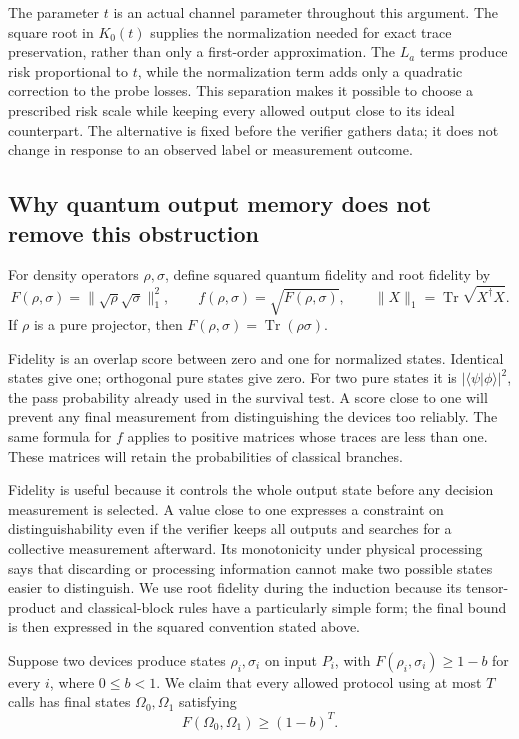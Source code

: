 \documentclass[11pt,a4paper]{article}
\newcommand{\Tr}{\operatorname{Tr}}
\numberwithin{equation}{section}
\begin{document}
The parameter $t$ is an actual channel parameter throughout this argument.
The square root in $K_0(t)$ supplies the normalization needed for exact
trace preservation, rather than only a first-order approximation.  The
$L_a$ terms produce risk proportional to $t$, while the normalization term
adds only a quadratic correction to the probe losses.  This separation
makes it possible to choose a prescribed risk scale while keeping every
allowed output close to its ideal counterpart.  The alternative is fixed
before the verifier gathers data; it does not change in response to an
observed label or measurement outcome.

\subsection{Why quantum output memory does not remove this obstruction}

For density operators $\rho,\sigma$, define squared quantum fidelity and
root fidelity by
\[
 F(\rho,\sigma)=\|\sqrt\rho\sqrt\sigma\|_1^2,
 \qquad f(\rho,\sigma)=\sqrt{F(\rho,\sigma)},
 \qquad \|X\|_1=\Tr\sqrt{X^\dagger X}.
\]
If $\rho$ is a pure projector, then $F(\rho,\sigma)=\Tr(\rho\sigma)$.

Fidelity is an overlap score between zero and one for normalized states.
Identical states give one; orthogonal pure states give zero. For two pure
states it is $|\langle\psi|\phi\rangle|^2$, the pass probability already
used in the survival test. A score close to one will prevent any final
measurement from distinguishing the devices too reliably.
The same formula for $f$ applies to positive matrices whose traces are less
than one.  These matrices will retain the probabilities of classical
branches.

Fidelity is useful because it controls the whole output state before any
decision measurement is selected.  A value close to one expresses a
constraint on distinguishability even if the verifier keeps all outputs
and searches for a collective measurement afterward.  Its monotonicity
under physical processing says that discarding or processing information
cannot make two possible states easier to distinguish.  We use root
fidelity during the induction because its tensor-product and classical-block
rules have a particularly simple form; the final bound is then expressed
in the squared convention stated above.

Suppose two devices produce states $\rho_i,\sigma_i$ on input $P_i$,
with $F(\rho_i,\sigma_i)\geq1-b$ for every $i$, where $0\leq b<1$.
We claim that every allowed protocol using at most $T$ calls has final
states $\Omega_0,\Omega_1$ satisfying
\begin{equation}
 F(\Omega_0,\Omega_1)\geq(1-b)^T.
 \label{dc:adaptive-fidelity}
\end{equation}
\end{document}
